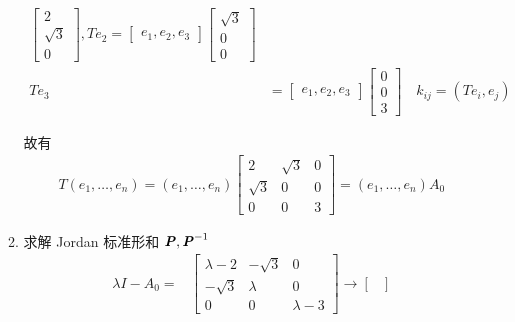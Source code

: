 \begin{solution}
\begin{enumerate}
\begin{enumerate}
\begin{align*}
\begin{bmatrix}
                                    2 \\ \sqrt{3} \\ 0
                                \end{bmatrix}, Te_2 = \begin{bmatrix}
                                    e_1, e_2, e_3
                                \end{bmatrix}\begin{bmatrix}
                                    \sqrt{3} \\ 0 \\ 0
                                \end{bmatrix} \\ Te_3 &= \begin{bmatrix}
                                    e_1, e_2, e_3
                                \end{bmatrix}\begin{bmatrix}
                                    0 \\ 0 \\ 3
                                \end{bmatrix} \quad k_{ij} = (Te_i, e_j)
                            \end{align*}
                            \par 故有
                            \begin{align*}
                                T(e_1, \dots, e_n) = (e_1, \dots, e_n)\begin{bmatrix}
                                    2 & \sqrt{3} & 0 \\ \sqrt{3} & 0 & 0 \\ 0 & 0 & 3
                                \end{bmatrix} = (e_1, \dots, e_n)A_0
                            \end{align*}
                        \item 求解 Jordan 标准形和 $\textbf{\textit{P}}, \textbf{\textit{P}}^{-1}$
                            \begin{align*}
                                \lambda I - A_0 =& \begin{bmatrix}
                                    \lambda - 2 & -\sqrt{3} & 0 \\ -\sqrt{3} & \lambda & 0 \\ 0 & 0 & \lambda - 3
                                \end{bmatrix} \rightarrow \begin{bmatrix}

\end{bmatrix}
\end{align*}
\end{enumerate}
\end{enumerate}
\end{solution}
